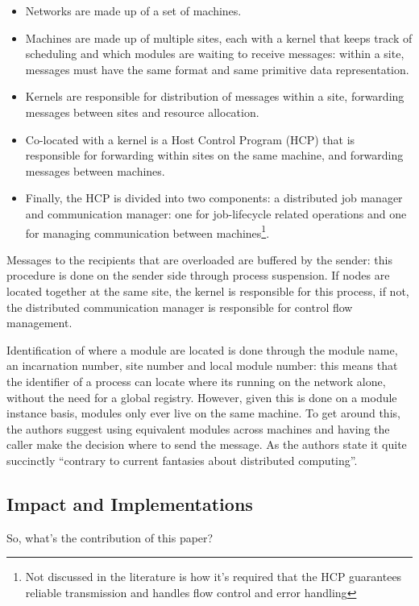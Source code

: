 \begin{itemize}
\item Networks are made up of a set of machines.
\item Machines are made up of multiple sites, each with a kernel that keeps track of scheduling and which modules are waiting to receive messages: within a site, messages must have the same format and same primitive data representation.
\item Kernels are responsible for distribution of messages within a site, forwarding messages between sites and resource allocation.
\item Co-located with a kernel is a Host Control Program (HCP) that is responsible for forwarding within sites on the same machine, and forwarding messages between machines.
\item Finally, the HCP is divided into two components: a distributed job manager and communication manager: one for job-lifecycle related operations and one for managing communication between machines\footnote{Not discussed in the literature is how it's required that the HCP guarantees reliable transmission and handles flow control and error handling}.
\end{itemize}

Messages to the recipients that are overloaded are buffered by the sender: this procedure is done on the sender side through process suspension.  If nodes are located together at the same site, the kernel is responsible for this process, if not, the distributed communication manager is responsible for control flow management.

Identification of where a module are located is done through the module name, an incarnation number, site number and local module number: this means that the identifier of a process can locate where its running on the network alone, without the need for a global registry.  However, given this is done on a module instance basis, modules only ever live on the same machine.  To get around this, the authors suggest using equivalent modules across machines and having the caller make the decision where to send the message.  As the authors state it quite succinctly ``contrary to current fantasies about distributed computing''.

\subsection{Impact and Implementations}
So, what's the contribution of this paper?

